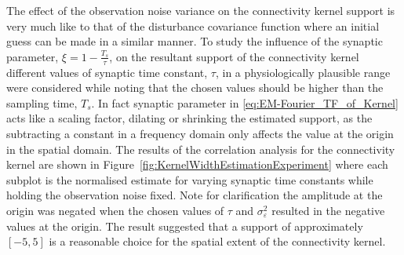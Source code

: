\documentclass[]{article}
\begin{document}
The effect of the observation noise variance on the connectivity kernel support is very much like to that of the disturbance covariance function where an initial guess can be made in a similar manner. To study the influence of the synaptic parameter, $\xi=1-\frac{ T_s}{\tau}$, on the resultant support of the connectivity kernel different values of synaptic time constant, $\tau$, in a physiologically plausible range were considered  while noting that the chosen values should be higher than the sampling time, $T_s$. In fact synaptic parameter in \eqref{eq:EM-Fourier_TF_of_Kernel}  acts like a scaling factor, dilating or shrinking the estimated support, as the subtracting a constant in a frequency domain only affects the value at the origin in the spatial domain. The results of the correlation analysis for the connectivity kernel are shown in Figure~\ref{fig:KernelWidthEstimationExperiment} where each subplot is the normalised  estimate for varying synaptic time constants while holding the observation noise fixed. Note  for clarification the amplitude at the origin was negated when the chosen values of $\tau$ and $\sigma^2_{\varepsilon}$ resulted in the negative values at the origin. The result suggested that a support of approximately $\left[-5,5 \right] $ is a reasonable choice for the spatial extent of the connectivity kernel.
\end{document}
